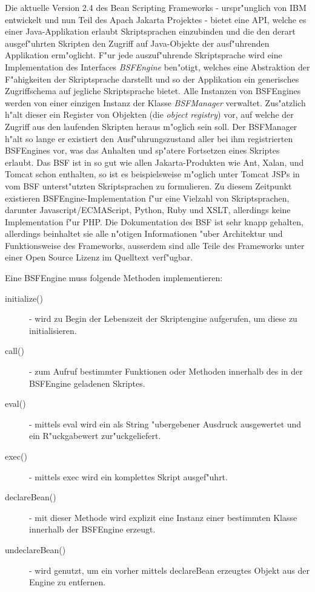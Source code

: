 Die aktuelle Version 2.4 des Bean Scripting Frameworks - urspr"unglich von IBM entwickelt und nun Teil des
Apach Jakarta Projektes \cite{BSFHP} - bietet eine API, welche es einer Java-Applikation erlaubt 
Skriptsprachen einzubinden und die den derart ausgef"uhrten Skripten den Zugriff auf Java-Objekte der ausf"uhrenden Applikation erm"oglicht.
F"ur jede auszuf"uhrende Skriptsprache wird eine Implementation des Interfaces \emph{BSFEngine} ben"otigt, welches eine
Abstraktion der F"ahigkeiten der Skriptsprache darstellt und so der Applikation ein generisches Zugriffschema
auf jegliche Skriptsprache bietet. Alle Instanzen von BSFEngines werden von einer einzigen Instanz der Klasse \emph{BSFManager} 
verwaltet. Zus"atzlich h"alt dieser ein Register von Objekten (die \emph{object registry}) vor, auf welche der Zugriff aus den 
laufenden Skripten heraus m"oglich sein soll. Der BSFManager h"alt so lange er existiert den Ausf"uhrungszustand aller bei 
ihm registrierten BSFEngines vor, was das Anhalten und sp"atere Fortsetzen eines Skriptes erlaubt.
Das BSF ist in so gut wie allen Jakarta-Produkten wie Ant, Xalan, und Tomcat schon enthalten, so ist es beispielsweise
m"oglich unter Tomcat JSPs in vom BSF unterst"utzten Skriptsprachen zu formulieren.
Zu diesem Zeitpunkt existieren BSFEngine-Implementation f"ur eine Vielzahl von Skriptsprachen, darunter Javascript/ECMAScript, 
Python, Ruby und XSLT, allerdings keine Implementation f"ur PHP. Die Dokumentation des BSF ist sehr knapp gehalten, allerdings
beinhaltet sie alle n"otigen Informationen "uber Architektur und Funktionsweise des Frameworks, ausserdem sind alle
Teile des Frameworks unter einer Open Source Lizenz im Quelltext verf"ugbar.

Eine BSFEngine muss folgende Methoden implementieren:
\begin{description}
    \item[initialize()] - wird zu Begin der Lebenszeit der Skriptengine aufgerufen, um diese zu initialisieren.
    \item[call()] - zum Aufruf bestimmter Funktionen oder Methoden innerhalb des in der BSFEngine geladenen Skriptes.
    \item[eval()] - mittels eval wird ein als String "ubergebener Ausdruck ausgewertet und ein R"uckgabewert zur"uckgeliefert.
    \item[exec()] - mittels exec wird ein komplettes Skript ausgef"uhrt.
    \item[declareBean()] - mit dieser Methode wird explizit eine Instanz einer bestimmten Klasse innerhalb der BSFEngine erzeugt.
    \item[undeclareBean()] - wird genutzt, um ein vorher mittels declareBean erzeugtes Objekt aus der Engine zu entfernen.
\end{description}

